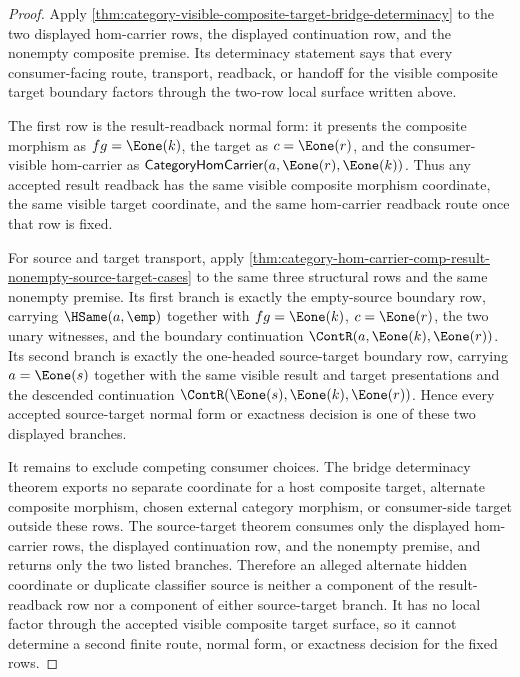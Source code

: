 \begin{proof}
Apply \autoref{thm:category-visible-composite-target-bridge-determinacy} to the
two displayed hom-carrier rows, the displayed continuation row, and the
nonempty composite premise. Its determinacy statement says that every
consumer-facing route, transport, readback, or handoff for the visible composite
target boundary factors through the two-row local surface written above.

The first row is the result-readback normal form: it presents the composite
morphism as $fg=\Eone(k)$, the target as $c=\Eone(r)$, and the consumer-visible
hom-carrier as $\mathsf{CategoryHomCarrier}(a,\Eone(r),\Eone(k))$. Thus any
accepted result readback has the same visible composite morphism coordinate,
the same visible target coordinate, and the same hom-carrier readback route
once that row is fixed.

For source and target transport, apply
\autoref{thm:category-hom-carrier-comp-result-nonempty-source-target-cases} to
the same three structural rows and the same nonempty premise. Its first branch
is exactly the empty-source boundary row, carrying $\HSame(a,\emp)$ together
with $fg=\Eone(k)$, $c=\Eone(r)$, the two unary witnesses, and the boundary
continuation $\ContR(a,\Eone(k),\Eone(r))$. Its second branch is exactly the
one-headed source-target boundary row, carrying $a=\Eone(s)$ together with the
same visible result and target presentations and the descended continuation
$\ContR(\Eone(s),\Eone(k),\Eone(r))$. Hence every accepted source-target
normal form or exactness decision is one of these two displayed branches.

It remains to exclude competing consumer choices. The bridge determinacy theorem
exports no separate coordinate for a host composite target, alternate composite
morphism, chosen external category morphism, or consumer-side target outside
these rows. The source-target theorem consumes only the displayed hom-carrier
rows, the displayed continuation row, and the nonempty premise, and returns only
the two listed branches. Therefore an alleged alternate hidden coordinate or
duplicate classifier source is neither a component of the result-readback row
nor a component of either source-target branch. It has no local factor through
the accepted visible composite target surface, so it cannot determine a second
finite route, normal form, or exactness decision for the fixed rows.
\end{proof}
